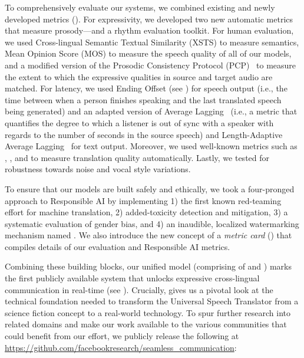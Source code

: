 \documentclass[twoside,11pt]{fairmeta_seamless}
\begin{document}
To comprehensively evaluate our systems, we combined existing and newly developed metrics (). For expressivity, we developed two new automatic metrics that measure prosody—\comparator and a rhythm evaluation toolkit. For human evaluation, we used Cross-lingual Semantic Textual Similarity (XSTS) \citep{licht2022xsts} to measure semantics, Mean Opinion Score (MOS) to measure the speech quality of all of our models,  
and a modified version of the Prosodic Consistency Protocol (PCP)~\citep{huang2023holistic} to measure the extent to which the expressive qualities in source and target audio are matched. 
For latency, we used Ending Offset (see ) for speech output (i.e., the time between when a person finishes speaking and the last translated speech being generated) and an adapted version of Average Lagging~\citep{ma_stacl_2019, ma_simulmt_2020} (i.e., a metric that quantifies the degree to which a listener is out of sync with a speaker with regards to the number of seconds in the source speech) and Length-Adaptive Average Lagging~\citep{papi-etal-2022-generation} for text output. Moreover, we used well-known metrics such as \bleu, \chrf, and \blaser to measure translation quality automatically. Lastly, we tested for robustness towards noise and vocal style variations. 

To ensure that our models are built safely and ethically, we took a four-pronged approach to Responsible AI by implementing 1) the first known red-teaming effort for machine translation, 2) added-toxicity detection and mitigation, 3) a systematic evaluation of gender bias, and 4) an inaudible, localized watermarking mechanism named \watermark.
We also introduce the new concept of a \textit{metric card} () that compiles details of our evaluation and Responsible AI metrics.

Combining these building blocks, our unified model \textbf{\seamless} (comprising of \expressive and \streaming) marks the first publicly available system that unlocks expressive cross-lingual communication in real-time (see ). Crucially, \seamless gives us a pivotal look at the technical foundation needed to transform the Universal Speech Translator from a science fiction concept to a real-world technology. To spur further research into related domains and make our work available to the various communities that could benefit from our effort, we publicly release the following at \url{https://github.com/facebookresearch/seamless_communication}:
\end{document}
